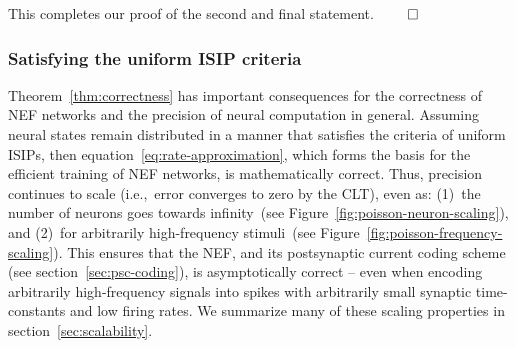 This completes our proof of the second and final statement. $\hfill \qed$

\subsubsection{Satisfying the uniform ISIP criteria}

Theorem~\ref{thm:correctness} has important consequences for the correctness of NEF networks and the precision of neural computation in general.
Assuming neural states remain distributed in a manner that satisfies the criteria of uniform ISIPs, then equation~\ref{eq:rate-approximation}, which forms the basis for the efficient training of NEF networks, is mathematically correct.
Thus, precision continues to scale (i.e.,~error converges to zero by the CLT), even as:
(1)~the number of neurons goes towards infinity~(see Figure~\ref{fig:poisson-neuron-scaling}), and
(2)~for arbitrarily high-frequency stimuli~(see Figure~\ref{fig:poisson-frequency-scaling}).
This ensures that the NEF, and its postsynaptic current coding scheme (see section~\ref{sec:psc-coding}), is asymptotically correct -- even when encoding arbitrarily high-frequency signals into spikes with arbitrarily small synaptic time-constants and low firing rates.
We summarize many of these scaling properties in section~\ref{sec:scalability}.


